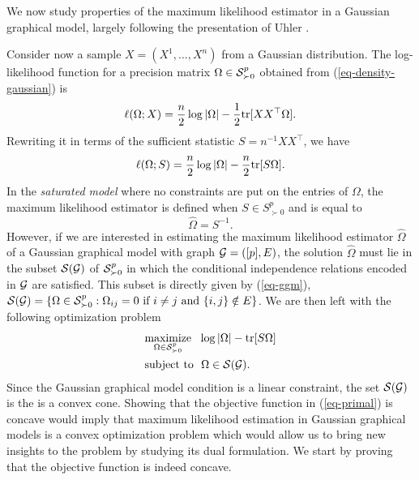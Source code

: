 We now study properties of the maximum likelihood estimator in a Gaussian graphical model, largely following the presentation of Uhler \cite[Section 9]{maathuis2018handbook}.

Consider now a sample $X = (X^{1}, \ldots, X^{n})$ from a Gaussian distribution. The log-likelihood function for a precision matrix $\Omega \in \S^p_{\succ 0}$ obtained from (\ref{eq-density-gaussian}) is
\begin{equation*}
    \ell(\Omega; X) = \frac{n}{2} \log |\Omega| - \frac{1}{2}\tr[XX^\top\Omega].
\end{equation*}
Rewriting it in terms of the sufficient statistic $S = n^{-1}XX^\top$, we have
\begin{equation} \label{eq-likelihood}
    \ell(\Omega; S) = \frac{n}{2}\log |\Omega| - \frac{n}{2}\tr[S\Omega].
\end{equation}
In the \textit{saturated model} where no constraints are put on the entries of $\Omega$, the maximum likelihood estimator is defined when $S \in S^p_{\succ 0}$ and is equal to
\begin{equation*}
    \hat\Omega = S^{-1}.
\end{equation*}
However, if we are interested in estimating the maximum likelihood estimator $\hat\Omega$ of a Gaussian graphical model with graph $\G = ([p], E)$, the solution $\hat\Omega$ must lie in the subset $\S(\G)$ of $\S^p_{\succ 0}$ in which the conditional independence relations encoded in $\G$ are satisfied. This subset is directly given by (\ref{eq-ggm}), $\S(\G) = \{ \Omega \in \S^p_{\succ 0} : \Omega_{ij} = 0 \t{ if } i \neq j \t{ and } \eset{i,j} \notin E \}$. We are then left with the following optimization problem
\begin{align} \label{eq-primal}
    \begin{split}
        &\underset{\Omega \in \S^p_{\succ 0}}{\t{maximize}}\ \  \log |\Omega| - \tr[S\Omega]\\
        &\t{subject to}\ \ \Omega \in \S(\G).
    \end{split}
\end{align}
Since the Gaussian graphical model condition is a linear constraint, the set $\S(\G)$ is the is a convex cone. Showing that the objective function in (\ref{eq-primal}) is concave would imply that maximum likelihood estimation in Gaussian graphical models is a convex optimization problem which would allow us to bring new insights to the problem by studying its dual formulation. We start by proving that the objective function is indeed concave.
